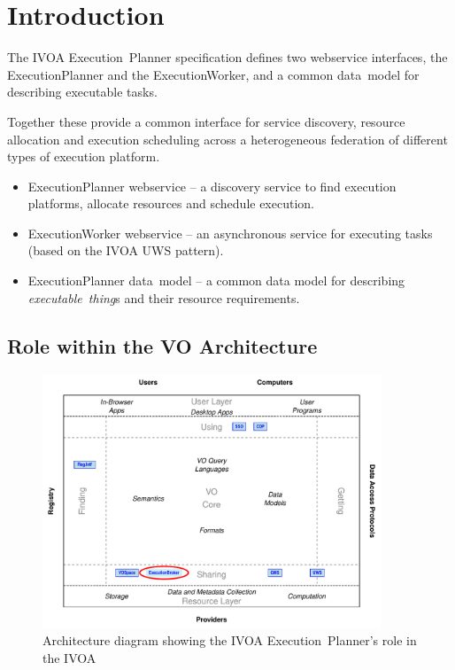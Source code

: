 \documentclass[11pt,a4paper]{ivoa}
\newcommand{\datamodel} {data~model}
\newcommand{\webservice} {webservice}
\newcommand{\ivoa} {IVOA}
\newcommand{\uws} {UWS}
\newcommand{\execplanner} {ExecutionPlanner}
\newcommand{\execworker} {ExecutionWorker}
\newcommand{\executionplanner} {Execution~Planner}
\newcommand{\executablething} {\textit{executable~thing}}
\begin{document}
\section{Introduction}
\label{sec:introduction}

The \ivoa{} \executionplanner{} specification defines two \webservice{} interfaces,
the \execplanner{} and the \execworker{}, and a common \datamodel{} for describing
executable tasks.

Together these provide a common interface for service discovery, resource allocation
and execution scheduling across a heterogeneous federation of different types of
execution platform.

\begin{itemize}
    \item \execplanner{} \webservice{} – a discovery service to find execution platforms, allocate resources and schedule execution.
    \item \execworker{} \webservice{} – an asynchronous service for executing tasks (based on the \ivoa{} \uws{} pattern).
    \item \execplanner{} \datamodel{} – a common data model for describing \executablething{}s and their resource requirements.
\end{itemize}

\subsection{Role within the VO Architecture}
\label{subsec:ivoarole}

\begin{figure}
\centering
\includegraphics[width=0.9\textwidth]{role_diagram.pdf}
\caption{Architecture diagram showing the \ivoa{} \executionplanner{}'s role in the \ivoa}
\label{fig:archdiag}
\end{figure}
\end{document}
